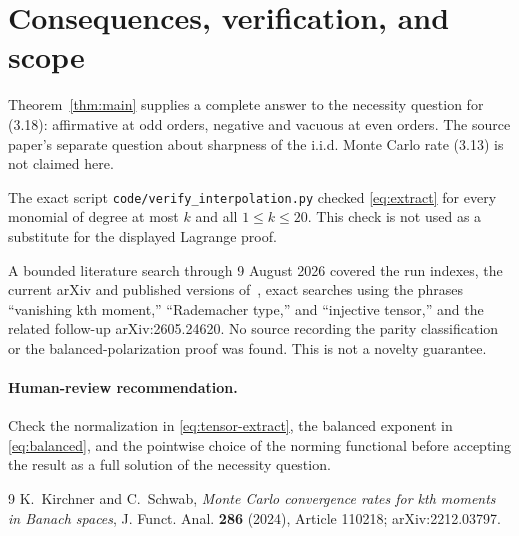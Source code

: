 \documentclass[11pt]{article}
\begin{document}
\section{Consequences, verification, and scope}

Theorem~\ref{thm:main} supplies a complete answer to the necessity question
for (3.18): affirmative at odd orders, negative and vacuous at even orders.
The source paper's separate question about sharpness of the i.i.d. Monte Carlo
rate (3.13) is not claimed here.

The exact script \texttt{code/verify\_interpolation.py} checked
\eqref{eq:extract} for every monomial of degree at most $k$ and all
$1\le k\le20$.  This check is not used as a substitute for the displayed
Lagrange proof.

A bounded literature search through 9 August 2026 covered the run indexes,
the current arXiv and published versions of~\cite{KS}, exact searches using
the phrases ``vanishing kth moment,'' ``Rademacher type,'' and ``injective
tensor,'' and the related follow-up arXiv:2605.24620.  No source recording the
parity classification or the balanced-polarization proof was found.  This is
not a novelty guarantee.

\paragraph{Human-review recommendation.}
Check the normalization in \eqref{eq:tensor-extract}, the balanced exponent in
\eqref{eq:balanced}, and the pointwise choice of the norming functional before
accepting the result as a full solution of the necessity question.

\begin{thebibliography}{9}
K.~Kirchner and C.~Schwab,
\emph{Monte Carlo convergence rates for kth moments in Banach spaces},
J. Funct. Anal. \textbf{286} (2024), Article 110218;
arXiv:2212.03797.
\end{thebibliography}
\end{document}
